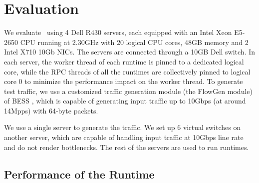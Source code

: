 \section{Evaluation}
\label{sec:nfvactor-evaluation}


We evaluate \nfactor~using 4 Dell R430 servers, each equipped with an Intel Xeon E5-2650 CPU running at 2.30GHz with 20 logical CPU cores, 48GB memory and 2 Intel X710 10Gb NICs. The servers are connected through a 10GB Dell switch. In each server, the worker thread of each runtime is pinned to a dedicated logical core, while the RPC threads of all the runtimes are collectively pinned to logical core 0 to minimize the performance impact on the worker thread. To generate test traffic, we use a customized traffic generation module (the FlowGen module) of BESS \cite{bess}, which is capable of generating input traffic up to 10Gbps (at around 14Mpps) with 64-byte packets.

We use a single server to generate the traffic. We set up 6 virtual switches on another server, which are capable of handling input traffic at 10Gbps line rate and do not render bottlenecks. The rest of the servers are used to run runtimes.

\subsection{Performance of the Runtime}
\label{sec:micro-benchmark}

